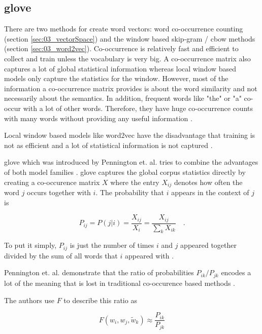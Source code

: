 \subsection{\acrfull{glove}}

There are two methods for create word vectors: word co-occurrence counting {(section \ref{sec:03_vectorSpace})} and the window based skip-gram / \gls{cbow} methods {(section \ref{sec:03_word2vec})}. Co-occurrence is relatively fast and efficient to collect and train unless the vocabulary is very big. A co-occurrence matrix also captures a lot of global statistical information whereas local window based models only capture the statistics for the window. However, most of the information a co-occurrence matrix provides is about the word similarity and not necessarily about the semantics. In addition, frequent words like "the" or "a" co-occur with a lot of other words. Therefore, they have huge co-occurrence counts with many words without providing any useful information \cite{Pennington2014a}.

Local window based models like word2vec have the disadvantage that training is not as efficient and a lot of statistical information is not captured \cite{Pennington2014a}. 
\medskip

\gls{glove} which was introduced by Pennington et. al. tries to combine the advantages of both model families \cite{Pennington2014a}. \gls{glove} captures the global corpus statistics directly by creating a co-occurence matrix $X$ where the entry $X_{ij}$ denotes how often the word $j$ occurs together with $i$. The probability that $i$ appears in the context of $j$ is 

\begin{equation}
	P_{ij}=P(j|i)=\frac{X_{ij}}{X_i}=\frac{X_{ij}}{\sum_k X_{ik}}\quad.
\end{equation}

To put it simply, $P_{ij}$ is just the number of times $i$ and $j$ appeared together divided by the sum of all words that $i$ appeared with \cite{Pennington2014a}.

Pennington et. al. demonstrate that the ratio of probabilities $P_{ik} / P_{jk}$  encodes a lot of the meaning that is lost in traditional co-occurence based methods \cite{Pennington2014a}.
\medskip

The authors use $F$ to describe this ratio as

\begin{equation}
	F(w_i, w_j, \widetilde{w}_k) \approx \frac{P_{ik}}{P_{jk}}
\end{equation}

